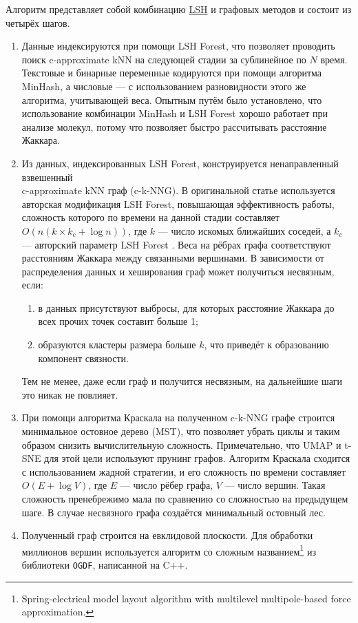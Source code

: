 \documentclass[10pt, a4paper]{extarticle}
\newcommand{\code}[1]{\texttt{#1}}
\begin{document}
Алгоритм представляет собой комбинацию \href{https://ru.wikipedia.org/wiki/Locality-sensitive_hashing}{LSH} и графовых методов и состоит из четырёх шагов.
\begin{enumerate}
	\item Данные индексируются при помощи LSH Forest, что позволяет проводить поиск c-approximate kNN на следующей стадии за сублинейное по $N$ время. Текстовые и бинарные переменные кодируются при помощи алгоритма MinHash, а числовые — с использованием разновидности этого же алгоритма, учитывающей веса. Опытным путём было установлено, что использование комбинации MinHash и LSH Forest хорошо работает при анализе молекул, потому что позволяет быстро рассчитывать расстояние Жаккара.
	 
	\item Из данных, индексированных LSH Forest, конструируется ненаправленный взвешенный \\ c-approximate kNN граф (c-k-NNG). В оригинальной статье используется авторская модификация LSH Forest, повышающая эффективность работы, сложность которого по времени на данной стадии составляет $O(n(k\times k_c + \log n))$, где $k$ — число искомых ближайших соседей, а $k_c$ — авторский параметр LSH Forest \cite{probst2018probabilistic}. Веса на рёбрах графа соответствуют расстояниям Жаккара между связанными вершинами. В зависимости от распределения данных и хеширования граф может получиться несвязным, если:
		\begin{enumerate}
			\item в данных присутствуют выбросы, для которых расстояние Жаккара до всех прочих точек составит больше 1;
			\item образуются кластеры размера больше $k$, что приведёт к образованию компонент связности. 
		\end{enumerate}
	Тем не менее, даже если граф и получится несвязным, на дальнейшие шаги это никак не повлияет. 
	
	\item При помощи алгоритма Краскала на полученном c-k-NNG графе строится минимальное остовное дерево (MST), что позволяет убрать циклы и таким образом снизить вычислительную сложность. Примечательно, что UMAP и t-SNE для этой цели используют прунинг графов. Алгоритм Краскала сходится с использованием жадной стратегии, и его сложность по времени составляет $O(E + \log V)$, где $E$ — число рёбер графа, $V$ — число вершин. Такая сложность пренебрежимо мала по сравнению со сложностью на предыдущем шаге. В случае несвязного графа создаётся минимальный остовный лес.
	
	\item Полученный граф строится на евклидовой плоскости. Для обработки миллионов вершин используется алгоритм со сложным названием\footnote{Spring-electrical model layout algorithm with multilevel multipole-based force approximation.} из библиотеки \code{OGDF}, написанной на C++. 
\end{enumerate}
\end{document}
